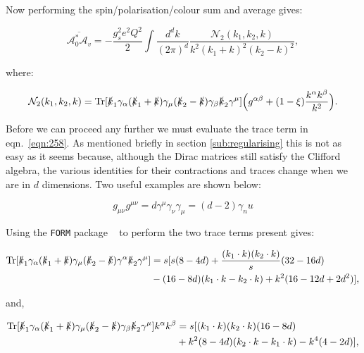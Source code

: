 			Now performing the spin/polarisation/colour sum and average gives:

			\begin{equation}
				\overline{\mathcal{A}_0^*\mathcal{A}_v} = -\frac{g_s^2e^2Q^2}{2}\int\frac{d^{d}k}
				{(2\pi)^{d}}\frac{\mathcal{N}_2(k_1, k_2,k)}{k^2(k_1+k)^2(k_2-k)^2},
			\end{equation}

			where:

			\begin{equation}
				\mathcal{N}_2(k_1, k_2, k) = \operatorname{Tr}[\slashed k_1 \gamma_\alpha(\slashed k_1 + \slashed k)\gamma_\mu
				(\slashed k_2 - \slashed k)\gamma_\beta\slashed k_2\gamma^\mu]\Big(g^{\alpha\beta} + (1-\xi)\frac{k^\alpha k^\beta}{k^2}\Big).
				\label{eqn:258}
			\end{equation}

			Before we can proceed any further we must evaluate the trace term in eqn.~\eqref{eqn:258}.  As mentioned briefly in section
			\ref{sub:regularising} this is not as easy as it seems because, although the Dirac matrices still satisfy the Clifford
			algebra, the various identities for their contractions and traces change when we are in $d$ dimensions.  Two useful
			examples are shown below:

			\begin{subequations}
				\begin{equation}
				g_{\mu\nu}g^{\mu\nu} = d
				\end{equation}
				\begin{equation}
				\gamma^\mu\gamma_\nu\gamma_\mu = (d-2)\gamma_nu
				\end{equation}
			\end{subequations}

			Using the \texttt{FORM} package ~\cite{form} to perform the two trace terms present gives:

			\begin{align}
			\begin{split}
				\operatorname{Tr}[\slashed k_1 \gamma_\alpha(\slashed k_1 + \slashed k)\gamma_\mu(\slashed k_2 -
				\slashed k)\gamma^\alpha\slashed k_2\gamma^\mu] &= s[s(8-4d) + \frac{(k_1\cdot k)(k_2\cdot k)}{s}(32-16d) \\
				&- (16-8d)(k_1\cdot k - k_2\cdot k) + k^2(16-12d+2d^2)],
			\end{split}
			\end{align}

			and,

			\begin{align}
			\begin{split}
				\operatorname{Tr}[\slashed k_1 \gamma_\alpha(\slashed k_1 + \slashed k)\gamma_\mu(\slashed k_2 - \slashed k)\gamma_\beta
				\slashed k_2\gamma^\mu]k^\alpha k^\beta &= s[(k_1\cdot k)(k_2\cdot k)(16 - 8d) \\
				&+ k^2(8 - 4d)(k_2\cdot k - k_1\cdot k) - k^4(4 - 2d)],
			\end{split}
			\end{align}


